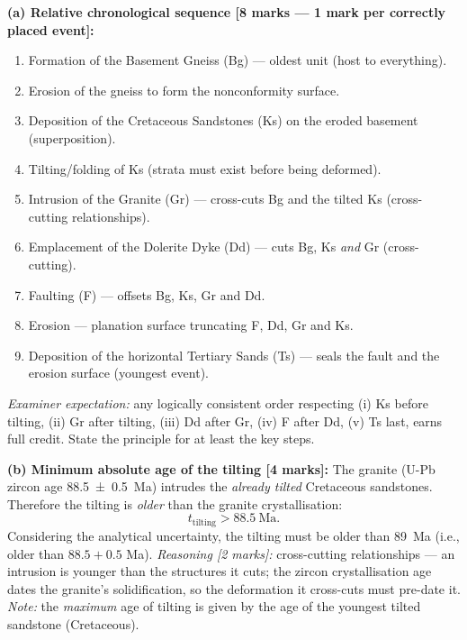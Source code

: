 \documentclass[11pt]{article}
\newcommand{\cle}[1]{{\popxbold\color{popdark}#1}}
\begin{document}
\begin{corrige}
\textbf{(a) Relative chronological sequence [8 marks — 1 mark per correctly placed event]:}

\begin{enumerate}
\item Formation of the Basement Gneiss (Bg) — oldest unit (host to everything).
\item Erosion of the gneiss to form the \cle{nonconformity} surface.
\item Deposition of the Cretaceous Sandstones (Ks) on the eroded basement (superposition).
\item Tilting/folding of Ks (strata must exist before being deformed).
\item Intrusion of the Granite (Gr) — cross-cuts Bg and the tilted Ks (cross-cutting relationships).
\item Emplacement of the Dolerite Dyke (Dd) — cuts Bg, Ks \emph{and} Gr (cross-cutting).
\item Faulting (F) — offsets Bg, Ks, Gr and Dd.
\item Erosion — planation surface truncating F, Dd, Gr and Ks.
\item Deposition of the horizontal Tertiary Sands (Ts) — seals the fault and the erosion surface (youngest event).
\end{enumerate}
\emph{Examiner expectation:} any logically consistent order respecting (i) Ks before tilting, (ii) Gr after tilting, (iii) Dd after Gr, (iv) F after Dd, (v) Ts last, earns full credit. State the principle for at least the key steps.

\textbf{(b) Minimum absolute age of the tilting [4 marks]:}
The granite (U-Pb zircon age \SI{88.5 \pm 0.5}{Ma}) intrudes the \emph{already tilted} Cretaceous sandstones. Therefore the tilting is \emph{older} than the granite crystallisation:
\[
t_{\text{tilting}} > 88.5\ \text{Ma}.
\]
Considering the analytical uncertainty, the tilting must be older than \SI{89}{Ma} (i.e., older than $88.5 + 0.5$ Ma). \emph{Reasoning [2 marks]:} cross-cutting relationships — an intrusion is younger than the structures it cuts; the zircon crystallisation age dates the granite's solidification, so the deformation it cross-cuts must pre-date it. \emph{Note:} the \emph{maximum} age of tilting is given by the age of the youngest tilted sandstone (Cretaceous).


\end{corrige}
\end{document}
